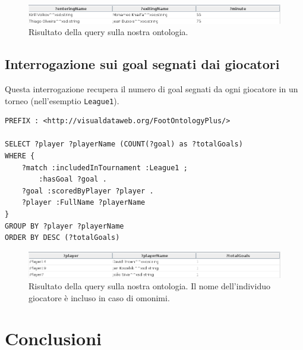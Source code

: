 \documentclass[11pt]{report} %
\begin{document}
\begin{figure}[H]
	\includegraphics[width=\textwidth]{query4}
	\caption{Risultato della query sulla nostra ontologia.}
\end{figure}

\section{Interrogazione sui goal segnati dai giocatori}

Questa interrogazione recupera il numero di goal segnati da ogni giocatore in un torneo (nell'esemptio \texttt{League1}).

\begin{lstlisting}
PREFIX : <http://visualdataweb.org/FootOntologyPlus/>

SELECT ?player ?playerName (COUNT(?goal) as ?totalGoals) 
WHERE {
    ?match :includedInTournament :League1 ;
        :hasGoal ?goal .
    ?goal :scoredByPlayer ?player .
    ?player :FullName ?playerName
}
GROUP BY ?player ?playerName
ORDER BY DESC (?totalGoals)
\end{lstlisting}

\begin{figure}[H]
	\includegraphics[width=\textwidth]{query5}
	\caption{Risultato della query sulla nostra ontologia. Il nome dell'individuo giocatore è incluso in caso di omonimi.}
\end{figure}



\chapter{Conclusioni}

\medspace

\printbibliography
\end{document}
